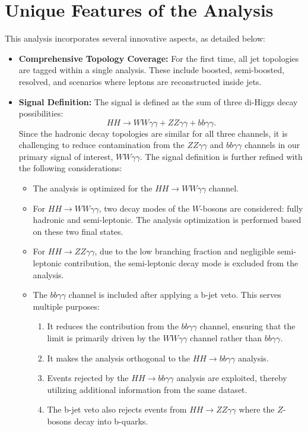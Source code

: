 \section{Unique Features of the Analysis}
This analysis incorporates several innovative aspects, as detailed below:

\begin{itemize}
    \item \textbf{Comprehensive Topology Coverage:}
    For the first time, all jet topologies are tagged within a single analysis. These include boosted, semi-boosted, resolved, and scenarios where leptons are reconstructed inside jets.

    \item \textbf{Signal Definition:}
    The signal is defined as the sum of three di-Higgs decay possibilities:
    \[
    HH \to WW\gamma\gamma + ZZ\gamma\gamma + bb\gamma\gamma.
    \]
    Since the hadronic decay topologies are similar for all three channels, it is challenging to reduce contamination from the \(ZZ\gamma\gamma\) and \(bb\gamma\gamma\) channels in our primary signal of interest, \(WW\gamma\gamma\). The signal definition is further refined with the following considerations:
    \begin{itemize}
        \item The analysis is optimized for the \(HH \to WW\gamma\gamma\) channel.
        \item For \(HH \to WW\gamma\gamma\), two decay modes of the \(W\)-bosons are considered: fully hadronic and semi-leptonic. The analysis optimization is performed based on these two final states.
        \item For \(HH \to ZZ\gamma\gamma\), due to the low branching fraction and negligible semi-leptonic contribution, the semi-leptonic decay mode is excluded from the analysis.
        \item The \(bb\gamma\gamma\) channel is included after applying a b-jet veto. This serves multiple purposes:
        \begin{enumerate}
            \item It reduces the contribution from the \(bb\gamma\gamma\) channel, ensuring that the limit is primarily driven by the \(WW\gamma\gamma\) channel rather than \(bb\gamma\gamma\).
            \item It makes the analysis orthogonal to the \(HH \to bb\gamma\gamma\) analysis.
            \item Events rejected by the \(HH \to bb\gamma\gamma\) analysis are exploited, thereby utilizing additional information from the same dataset.
            \item The b-jet veto also rejects events from \(HH \to ZZ\gamma\gamma\) where the \(Z\)-bosons decay into b-quarks.
        \end{enumerate}
    \end{itemize}


\end{itemize}
